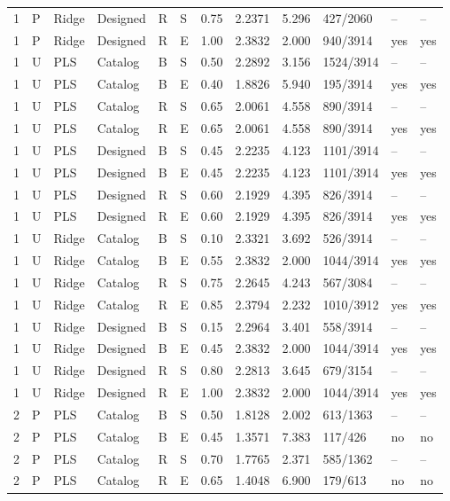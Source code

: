 \documentclass[10pt,a4paper]{article}
\begin{document}
\begin{landscape}
\begin{longtable}{rlllllrrrlll}
1 & P & Ridge & Designed & R & S & 0.75 & 2.2371 & 5.296 & 427/2060 & -- & -- \\
1 & P & Ridge & Designed & R & E & 1.00 & 2.3832 & 2.000 & 940/3914 & yes & yes \\
1 & U & PLS & Catalog & B & S & 0.50 & 2.2892 & 3.156 & 1524/3914 & -- & -- \\
1 & U & PLS & Catalog & B & E & 0.40 & 1.8826 & 5.940 & 195/3914 & yes & yes \\
1 & U & PLS & Catalog & R & S & 0.65 & 2.0061 & 4.558 & 890/3914 & -- & -- \\
1 & U & PLS & Catalog & R & E & 0.65 & 2.0061 & 4.558 & 890/3914 & yes & yes \\
1 & U & PLS & Designed & B & S & 0.45 & 2.2235 & 4.123 & 1101/3914 & -- & -- \\
1 & U & PLS & Designed & B & E & 0.45 & 2.2235 & 4.123 & 1101/3914 & yes & yes \\
1 & U & PLS & Designed & R & S & 0.60 & 2.1929 & 4.395 & 826/3914 & -- & -- \\
1 & U & PLS & Designed & R & E & 0.60 & 2.1929 & 4.395 & 826/3914 & yes & yes \\
1 & U & Ridge & Catalog & B & S & 0.10 & 2.3321 & 3.692 & 526/3914 & -- & -- \\
1 & U & Ridge & Catalog & B & E & 0.55 & 2.3832 & 2.000 & 1044/3914 & yes & yes \\
1 & U & Ridge & Catalog & R & S & 0.75 & 2.2645 & 4.243 & 567/3084 & -- & -- \\
1 & U & Ridge & Catalog & R & E & 0.85 & 2.3794 & 2.232 & 1010/3912 & yes & yes \\
1 & U & Ridge & Designed & B & S & 0.15 & 2.2964 & 3.401 & 558/3914 & -- & -- \\
1 & U & Ridge & Designed & B & E & 0.45 & 2.3832 & 2.000 & 1044/3914 & yes & yes \\
1 & U & Ridge & Designed & R & S & 0.80 & 2.2813 & 3.645 & 679/3154 & -- & -- \\
1 & U & Ridge & Designed & R & E & 1.00 & 2.3832 & 2.000 & 1044/3914 & yes & yes \\
2 & P & PLS & Catalog & B & S & 0.50 & 1.8128 & 2.002 & 613/1363 & -- & -- \\
2 & P & PLS & Catalog & B & E & 0.45 & 1.3571 & 7.383 & 117/426 & no & no \\
2 & P & PLS & Catalog & R & S & 0.70 & 1.7765 & 2.371 & 585/1362 & -- & -- \\
2 & P & PLS & Catalog & R & E & 0.65 & 1.4048 & 6.900 & 179/613 & no & no \\

\end{longtable}
\end{landscape}
\end{document}
